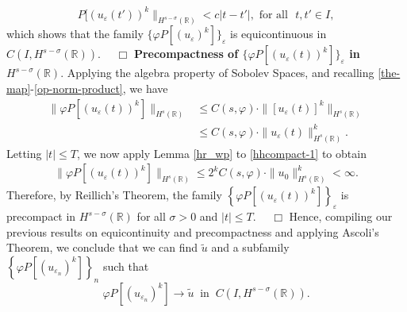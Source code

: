 \documentclass[12pt,reqno]{amsart}
\newcommand{\nin}{\noindent}
\newcommand{\rr}{\mathbb{R}}
\newcommand{\ee}{\varepsilon}
\newcommand{\vp}{\varphi}
\theoremstyle{plain}  %
\theoremstyle{definition}
\begin{document}
\begin{appendices}
\begin{equation*}
			P [(u_\ee(t'))^k \|_{H^{s - \sigma }(\rr)}< c|t -
			t'|, 
			\text{ for all }  \,\,  t, t'\in I,
		\end{equation*}
		which shows that  the family  $\{\varphi P [(u_\ee)^k]\}_\ee$ is
		equicontinuous in $C(I, H^{s-\sigma }(\rr))$.  $\quad \Box$
		\vskip0.1in
		\nin
		{\bf Precompactness of $\{\varphi P [(u_\ee(t))^k]\}_\ee$ in
		$H^{s-\sigma  }(\rr)$}.
		Applying the algebra property of Sobolev
		Spaces, and recalling \eqref{the-map}-\eqref{op-norm-product}, we have
		\begin{equation}
			\begin{split}
			\label{hhcompact-1}
			 \|\varphi P [(u_\ee(t))^k]\|_{H^{s}(\rr)}
			& \le  C(s, \vp) \cdot \|[u_\ee(t)]^k\|_{H^{s}(\rr)}
			\\
			& \le C(s, \vp) \cdot \|u_\ee(t)\|^k_{H^{s}(\rr)}.
			\end{split}
		\end{equation}
		Letting $|t| \le T$, we now apply Lemma \ref{hr_wp} to
		\eqref{hhcompact-1} to obtain
		\begin{equation*}
			\begin{split}
			\|\varphi P [(u_\ee(t))^k]\|_{H^{s}(\rr)}
			\le 2^k C(s, \vp) \cdot  \|u_0 \|^k_{H^s(\rr)} < \infty.
			\end{split}
		\end{equation*}
		Therefore, by Reillich's Theorem, the family $\left\{
		\varphi P [(u_\ee(t))^k] \right\}_\ee$ is
		precompact in $H^{s- \sigma }(\rr)$ for all $\sigma > 0$ and $|t| \le T$. $\quad
		\Box$ 
		\vskip0.1in
		Hence, compiling our previous results on equicontinuity and precompactness
		and applying Ascoli's Theorem, we
		conclude that we can find $\tilde{u}$ and a subfamily 
		\\ $\left\{
		\varphi P [(u_{\ee_n})^k]
		\right\}_n$ such that
		\begin{equation}
			\label{hhstrong-conv-of-u_ep}
			\varphi P [(u_{\ee_n})^k] \to \tilde{u}
			\; \; \text{in} \; \; C(I, H^{s-\sigma}(\rr)).
		\end{equation}
		

\end{appendices}
\end{document}
